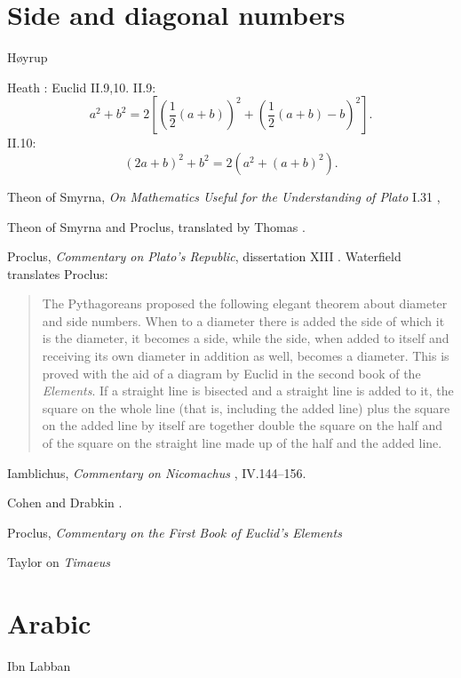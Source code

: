 \documentclass{article}
\theoremstyle{definition}
\begin{document}
\section{Side and diagonal numbers}
H{\o}yrup \cite[p.~261]{hoyrup}

Heath \cite[pp.~392--402]{euclidI}: Euclid II.9,10. II.9:
\[
a^2+b^2=2\left[ \left(  \frac{1}{2}(a+b) \right)^2
+\left(\frac{1}{2}(a+b)-b\right)^2 \right].
\]
II.10:
\[
(2a+b)^2 + b^2 = 2(a^2+(a+b)^2).
\]

Theon of Smyrna, {\em On Mathematics Useful for the Understanding of Plato} I.31  \cite[pp.~70--75]{dupuis}, 

Theon of Smyrna and Proclus, translated by Thomas \cite[pp.~132--139]{thomasI}.

Proclus, {\em Commentary on Plato's {\em Republic}}, dissertation XIII \cite[pp.~133--135]{festugiereII}.
Waterfield \cite[pp.~107--108]{waterfield} translates Proclus:

\begin{quote}
The Pythagoreans proposed the following elegant theorem
about diameter and side numbers. When to a diameter there is added
the side of which it is the diameter, it becomes a side, while the side,
when added to itself and receiving its own diameter in addition as
well, becomes a diameter. This is proved with the aid of a diagram by
Euclid in the second book of the {\em Elements}. If a straight line is
bisected and a straight line is added to it, the square on the whole
line (that is, including the added line) plus the square on the added
line by itself are together double the square on the half and of the
square on the straight line made up of the half and the added
line.
\end{quote}

Iamblichus, {\em Commentary on Nicomachus} \cite{iamblichus}, IV.144--156.

Cohen and Drabkin \cite[pp.~42--43]{drabkin}.


Proclus, {\em Commentary on the First Book of Euclid's Elements}  \cite{proclus}

Taylor on {\em Timaeus} \cite{taylortimaeus}




\section{Arabic}
Ibn Labban \cite{wisconsin8}
\end{document}
